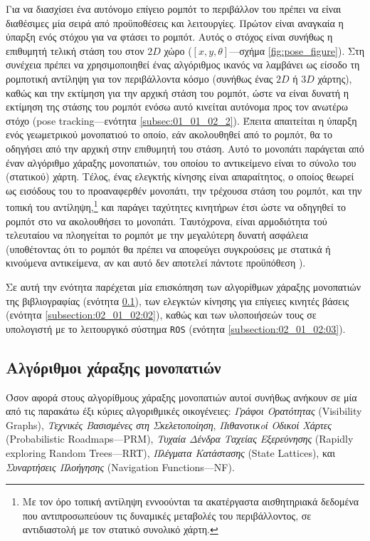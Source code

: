 Για να διασχίσει ένα αυτόνομο επίγειο ρομπότ το περιβάλλον του πρέπει να είναι
διαθέσιμες μία σειρά από προϋποθέσεις και λειτουργίες. Πρώτον είναι αναγκαία η
ύπαρξη ενός στόχου για να φτάσει το ρομπότ. Αυτός ο στόχος είναι συνήθως η
επιθυμητή τελική στάση του στον $2D$ χώρο ($[x, y, \theta]$---σχήμα
\ref{fig:pose_figure}). Στη συνέχεια πρέπει να χρησιμοποιηθεί ένας αλγόριθμος
ικανός να λαμβάνει ως είσοδο τη ρομποτική αντίληψη για τον περιβάλλοντα κόσμο
(συνήθως ένας $2D$ ή $3D$ χάρτης), καθώς και την εκτίμηση για την αρχική στάση
του ρομπότ, ώστε να είναι δυνατή η εκτίμηση της στάσης του ρομπότ ενόσω αυτό
κινείται αυτόνομα προς τον ανωτέρω στόχο (pose tracking---ενότητα
\ref{subsec:01_01_02_2}).  Έπειτα απαιτείται η ύπαρξη ενός γεωμετρικού
μονοπατιού το οποίο, εάν ακολουθηθεί από το ρομπότ, θα το οδηγήσει από την
αρχική στην επιθυμητή του στάση. Αυτό το μονοπάτι παράγεται από έναν αλγόριθμο
χάραξης μονοπατιών, του οποίου το αντικείμενο είναι το σύνολο του (στατικού)
χάρτη. Τέλος, ένας ελεγκτής κίνησης είναι απαραίτητος, ο οποίος θεωρεί ως
εισόδους του το προαναφερθέν μονοπάτι, την τρέχουσα στάση του ρομπότ, και την
τοπική του αντίληψη,\footnote{Με τον όρο τοπική αντίληψη εννοούνται τα
ακατέργαστα αισθητηριακά δεδομένα που αντιπροσωπεύουν τις δυναμικές μεταβολές
του περιβάλλοντος, σε αντιδιαστολή με τον στατικό συνολικό χάρτη.} και παράγει
ταχύτητες κινητήρων έτσι ώστε να οδηγηθεί το ρομπότ στο να ακολουθήσει το
μονοπάτι. Ταυτόχρονα, είναι αρμοδιότητα τού τελευταίου να πλοηγείται το ρομπότ
με την μεγαλύτερη δυνατή ασφάλεια (υποθέτοντας ότι το ρομπότ θα πρέπει να
αποφεύγει συγκρούσεις με στατικά ή κινούμενα αντικείμενα, αν και αυτό δεν
αποτελεί πάντοτε προϋπόθεση \cite{Gandhi2017}).

Σε αυτή την ενότητα παρέχεται μία επισκόπηση των αλγορίθμων χάραξης μονοπατιών
της βιβλιογραφίας (ενότητα \ref{subsection:02_01_02:01}), των ελεγκτών κίνησης
για επίγειες κινητές βάσεις (ενότητα \ref{subsection:02_01_02:02}), καθώς και
των υλοποιήσεών τους σε υπολογιστή με το λειτουργικό σύστημα \texttt{ROS}
(ενότητα \ref{subsection:02_01_02:03}).

\subsection{Αλγόριθμοι χάραξης μονοπατιών}
\label{subsection:02_01_02:01}

Όσον αφορά στους αλγορίθμους χάραξης μονοπατιών αυτοί συνήθως ανήκουν σε μία
από τις παρακάτω έξι κύριες αλγοριθμικές οικογένειες: \textit{Γράφοι
Ορατότητας} (Visibility Graphs), \textit{Τεχνικές Βασισμένες στη
Σκελετοποίηση}, \textit{Πιθανοτικoί Οδικοί Χάρτες} (Probabilistic
Roadmaps---PRM), \textit{Τυχαία Δένδρα Ταχείας Εξερεύνησης} (Rapidly exploring
Random Trees---RRT), \textit{Πλέγματα Κατάστασης} (State Lattices), και
\textit{Συναρτήσεις Πλοήγησης} (Navigation Functions---NF).


